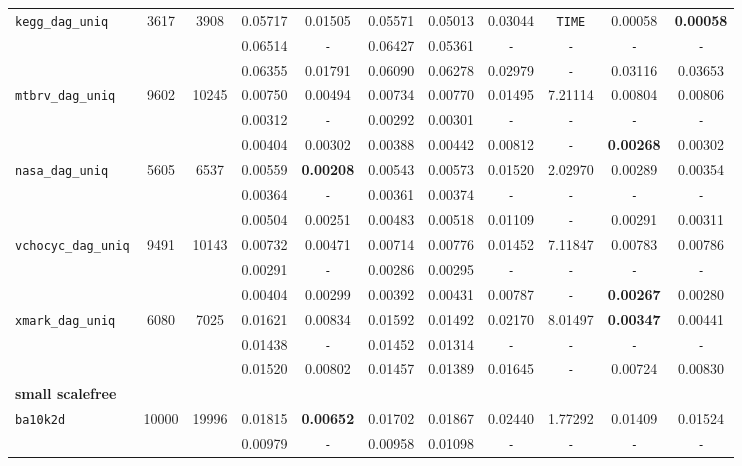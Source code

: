 {\begin{tabular}{ l c c | c c c c c c c c }
\hline
\verb|kegg_dag_uniq| & 3617 & 3908 & 0.05717 & 0.01505 & 0.05571 & 0.05013 & 0.03044 & \verb|TIME| & 0.00058 & \textbf{0.00058} \\
 &  &  & 0.06514 & \verb|-| & 0.06427 & 0.05361 & \verb|-| & \verb|-| & \verb|-| & \verb|-| \\
 &  &  & 0.06355 & 0.01791 & 0.06090 & 0.06278 & 0.02979 & \verb|-| & 0.03116 & 0.03653 \\
\hline
\verb|mtbrv_dag_uniq| & 9602 & 10245 & 0.00750 & 0.00494 & 0.00734 & 0.00770 & 0.01495 & 7.21114 & 0.00804 & 0.00806 \\
 &  &  & 0.00312 & \verb|-| & 0.00292 & 0.00301 & \verb|-| & \verb|-| & \verb|-| & \verb|-| \\
 &  &  & 0.00404 & 0.00302 & 0.00388 & 0.00442 & 0.00812 & \verb|-| & \textbf{0.00268} & 0.00302 \\
\hline
\verb|nasa_dag_uniq| & 5605 & 6537 & 0.00559 & \textbf{0.00208} & 0.00543 & 0.00573 & 0.01520 & 2.02970 & 0.00289 & 0.00354 \\
 &  &  & 0.00364 & \verb|-| & 0.00361 & 0.00374 & \verb|-| & \verb|-| & \verb|-| & \verb|-| \\
 &  &  & 0.00504 & 0.00251 & 0.00483 & 0.00518 & 0.01109 & \verb|-| & 0.00291 & 0.00311 \\
\hline
\verb|vchocyc_dag_uniq| & 9491 & 10143 & 0.00732 & 0.00471 & 0.00714 & 0.00776 & 0.01452 & 7.11847 & 0.00783 & 0.00786 \\
 &  &  & 0.00291 & \verb|-| & 0.00286 & 0.00295 & \verb|-| & \verb|-| & \verb|-| & \verb|-| \\
 &  &  & 0.00404 & 0.00299 & 0.00392 & 0.00431 & 0.00787 & \verb|-| & \textbf{0.00267} & 0.00280 \\
\hline
\verb|xmark_dag_uniq| & 6080 & 7025 & 0.01621 & 0.00834 & 0.01592 & 0.01492 & 0.02170 & 8.01497 & \textbf{0.00347} & 0.00441 \\
 &  &  & 0.01438 & \verb|-| & 0.01452 & 0.01314 & \verb|-| & \verb|-| & \verb|-| & \verb|-| \\
 &  &  & 0.01520 & 0.00802 & 0.01457 & 0.01389 & 0.01645 & \verb|-| & 0.00724 & 0.00830 \\
\hline
\multicolumn{11}{l}{\textbf{small scalefree}} \\
\hline
\verb|ba10k2d| & 10000 & 19996 & 0.01815 & \textbf{0.00652} & 0.01702 & 0.01867 & 0.02440 & 1.77292 & 0.01409 & 0.01524 \\
 &  &  & 0.00979 & \verb|-| & 0.00958 & 0.01098 & \verb|-| & \verb|-| & \verb|-| & \verb|-| \\

\end{tabular}}
